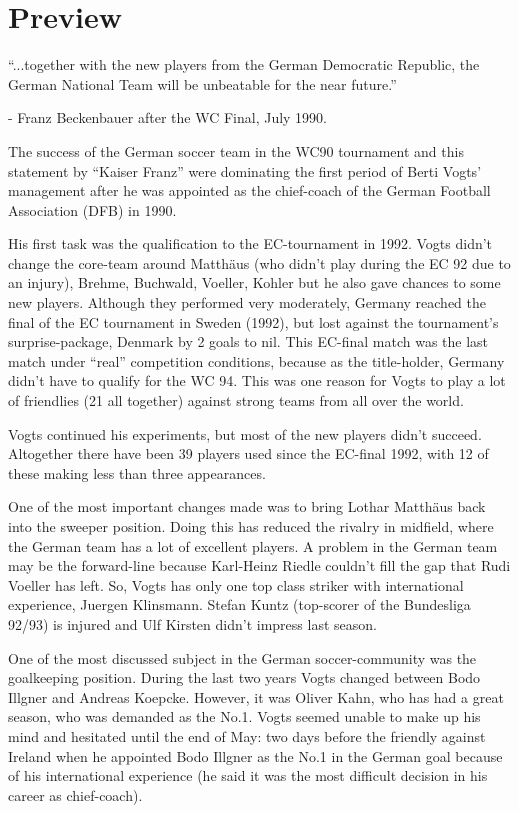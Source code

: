 \section{Preview}
\begin{center}``...together with the new players from the German Democratic Republic, the German National Team will be unbeatable for the near future.''\end{center}
 - Franz Beckenbauer after the WC Final, July 1990.

The success of the German soccer team in the WC90 tournament and this statement 
by ``Kaiser Franz'' were dominating the first period of Berti Vogts' management
after he was appointed as the chief-coach of the German Football Association 
(DFB) in 1990.

His first task was the qualification to the EC-tournament in 1992. Vogts didn't 
change the core-team around Matth{\"a}us (who didn't play during the EC 92 due to 
an injury), Brehme, Buchwald, Voeller, Kohler but he also gave chances to some 
new players. Although they performed very moderately, Germany reached the final 
of the EC tournament in Sweden (1992), but lost against the tournament's
surprise-package, Denmark by 2 goals to nil. This EC-final match was the last 
match under ``real'' competition conditions, because as the title-holder, Germany 
didn't have to qualify for the WC 94. This was one reason for Vogts to play a 
lot of friendlies (21 all together) against strong teams from all over the 
world.
 
Vogts continued his experiments, but most of the new players didn't succeed.
Altogether there have been 39 players used since the EC-final 1992, with 12 of
these making less than three appearances.

One of the most important changes made was to bring Lothar Matth{\"a}us back into
the sweeper position. Doing this has reduced the rivalry in midfield, where the 
German team has a lot of excellent players. A problem in the German team may be 
the forward-line because Karl-Heinz Riedle couldn't fill the gap that Rudi 
Voeller has left. So, Vogts has only one top class striker with international 
experience, Juergen Klinsmann. Stefan Kuntz (top-scorer of the Bundesliga 92/93) 
is injured and Ulf Kirsten didn't impress last season.

One of the most discussed subject in the German soccer-community was the 
goalkeeping position. During the last two years Vogts changed between Bodo 
Illgner and Andreas Koepcke. However, it was Oliver Kahn, who has had a great
season, who was demanded as the No.1. Vogts seemed unable to make up his mind 
and hesitated until the end of May: two days before the friendly against 
Ireland when he appointed Bodo Illgner as the No.1 in the German goal because 
of his international experience (he said it was the most difficult decision in 
his career as chief-coach).


